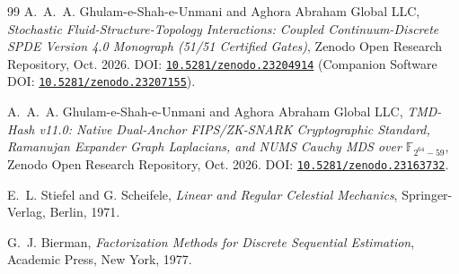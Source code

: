 \documentclass[11pt,a4paper]{article}
\theoremstyle{plain}
\theoremstyle{definition}
\theoremstyle{remark}
\begin{document}
\begin{thebibliography}{99}
A.~A.~A. Ghulam-e-Shah-e-Unmani and Aghora Abraham Global LLC,
\emph{Stochastic Fluid-Structure-Topology Interactions: Coupled Continuum-Discrete SPDE Version 4.0 Monograph (51/51 Certified Gates)},
Zenodo Open Research Repository, Oct. 2026.
DOI: \href{https://doi.org/10.5281/zenodo.23204914}{\texttt{10.5281/zenodo.23204914}} (Companion Software DOI: \href{https://doi.org/10.5281/zenodo.23207155}{\texttt{10.5281/zenodo.23207155}}).

A.~A.~A. Ghulam-e-Shah-e-Unmani and Aghora Abraham Global LLC,
\emph{TMD-Hash v11.0: Native Dual-Anchor FIPS/ZK-SNARK Cryptographic Standard, Ramanujan Expander Graph Laplacians, and NUMS Cauchy MDS over $\mathbb{F}_{2^{64}-59}$},
Zenodo Open Research Repository, Oct. 2026.
DOI: \href{https://doi.org/10.5281/zenodo.23163732}{\texttt{10.5281/zenodo.23163732}}.

E.~L. Stiefel and G. Scheifele,
\emph{Linear and Regular Celestial Mechanics},
Springer-Verlag, Berlin, 1971.

G.~J. Bierman,
\emph{Factorization Methods for Discrete Sequential Estimation},
Academic Press, New York, 1977.

\end{thebibliography}
\end{document}
